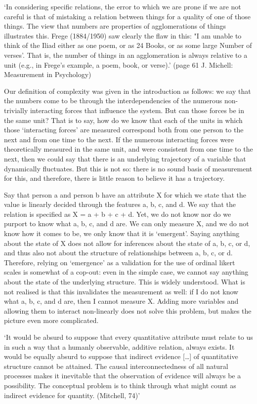 \documentclass[utf8]{FrontiersinVancouver}
\begin{document}
    `In considering specific relations, the error to which we are prone if we are not careful is that of mistaking a relation between things for a quality of one of those things. The view that numbers are properties of agglomerations of things illustrates this. Frege (1884/1950) saw clearly the flaw in this: "I am unable to think of the Iliad either as one poem, or as 24 Books, or as some large Number of verses'. That is, the number of things in an agglomeration is always relative to a unit (e.g., in Frege's example, a poem, book, or verse).' (page 61 J. Michell: Measurement in Psychology)

Our definition of complexity was given in the introduction as follows: we say that the numbers come to be through the interdependencies of the numerous non-trivially interacting forces that influence the system. But can those forces be in the same unit? That is to say, how do we know that each of the units in which those `interacting forces' are measured correspond both from one person to the next and from one time to the next. If the numerous interacting forces were theoretically measured in the same unit, and were consistent from one time to the next, then we could say that there is an underlying trajectory of a variable that dynamically fluctuates. But this is not so: there is no sound basis of measurement for this, and therefore, there is little reason to believe it has a trajectory.

Say that person a and person b have an attribute X for which we state that the value is linearly decided through the features a, b, c, and d. We say that the relation is specified as X = a + b + c + d. Yet, we do not know nor do we purport to know what a, b, c, and d are. We can only measure X, and we do not know how it comes to be, we only know that it is `emergent'. Saying anything about the state of X does not allow for inferences about the state of a, b, c, or d, and thus also not about the structure of relationships between a, b, c, or d. Therefore, relying on `emergence' as a validation for the use of ordinal likert scales is somewhat of a cop-out: even in the simple case, we cannot say anything about the state of the underlying structure. This is widely understood. What is not realised is that this invalidates the measurement as well: if I do not know what a, b, c, and d are, then I cannot measure X. Adding more variables and allowing them to interact non-linearly does not solve this problem, but makes the picture even more complicated.

    `It would be absurd to suppose that every quantitative attribute must relate to us in such a way that a humanly observable, additive relation, always exists. It would be equally absurd to suppose that indirect evidence [\ldots] of quantitative structure cannot be attained. The causal interconnectedness of all natural processes makes it inevitable that the observation of evidence will always be a possibility. The conceptual problem is to think through what might count as indirect evidence for quantity. (Mitchell, 74)'
\end{document}
